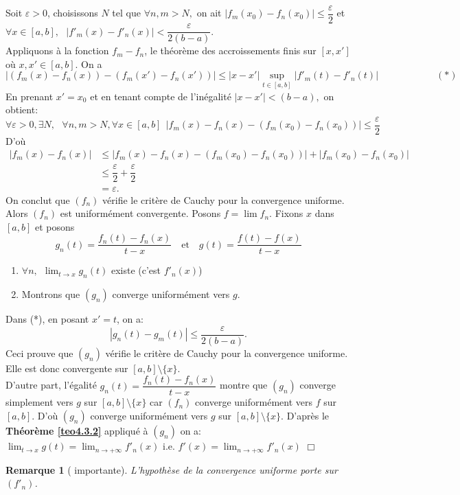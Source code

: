 \documentclass[11pt, a4paper]{book}
\newtheorem{rem}{Remarque}[section]
\newenvironment{pr}{\noindent {\bf Preuve} \noindent} {\hfill $\Box$\vskip 5mm}
\begin{document}
\begin{pr}\quad

Soit $\varepsilon>0$, choisissons $N$ tel que $\forall n,m>N,$ on ait $|f_m(x_0)-f_n(x_0)|\leq\dfrac{\varepsilon}{2}$ et $\forall x\in [a,b],~~~|f'_m(x)-f'_n(x)|<\dfrac{\varepsilon}{2(b-a)}.$\\
Appliquons \`a la fonction $f_m-f_n$, le th\'eor\`eme des accroissements finis sur $[x,x']$ o\`u $x,x'\in [a,b].$ On a $$|(f_m(x)-f_n(x))-(f_m(x')-f_n(x'))|\leq|x-x'|\sup_{t\in [a,b]}|f'_m(t)-f'_n(t)| \qquad\qquad\qquad(*)$$
En prenant $x'=x_0$ et en tenant compte de l'in\'egalit\'e $|x-x'|<(b-a),$ on obtient:
$$\forall \varepsilon>0,\exists N,~~~\forall n,m>N,\forall x\in[a,b]~~|f_m(x)-f_n(x)-(f_m(x_0)-f_n(x_0))|\leq\dfrac{\varepsilon}{2}$$ D'o\`u 
\begin{align*}
|f_m(x)-f_n(x)|&\leq|f_m(x)-f_n(x)-\left(f_m(x_0)-f_n(x_0)\right)|+|f_m(x_0)-f_n(x_0)|\\&\leq \dfrac{\varepsilon}{2}+\dfrac{\varepsilon}{2}\\&=\varepsilon.
\end{align*}
On conclut que $(f_n)$ v\'erifie le crit\`ere de Cauchy pour la convergence uniforme. Alors $(f_n)$ est uniform\'ement convergente. Posons $f=\lim f_n$. Fixons $x$ dans $[a,b]$ et posons $$ g_n(t)=\dfrac{f_n(t)-f_n(x)}{t-x}\quad\text{et}  \quad g(t)=\dfrac{f(t)-f(x)}{t-x}$$
\begin{enumerate}
\item ${\displaystyle \forall n,~~\lim_{t\rightarrow x}g_n(t)}$ existe (c'est $f'_n(x)$)
\item Montrons que $(g_n)$ converge uniform\'ement vers $g$. 
\end{enumerate}
Dans (*), en posant $x'=t$, on a:$$|g_n(t)-g_m(t)|\leq\dfrac{\varepsilon}{2(b-a)}.$$ Ceci prouve que $(g_n)$ v\'erifie le crit\`ere de Cauchy pour la convergence uniforme. Elle est donc convergente sur $[a,b]\setminus\{x\}.$ \\
D'autre part, l'\'egalit\'e $g_n(t)=\dfrac{f_n(t)-f_n(x)}{t-x}$ montre que $(g_n)$ converge simplement vers $g$ sur $[a,b]\setminus\{x\}$ car $(f_n)$ converge uniform\'ement vers $f$ sur $[a,b]$. D'o\`u $(g_n)$ converge uniform\'ement vers $g$ sur $[a,b]\setminus\{x\}$. D'apr\`es le \textbf{Th\'eor\`eme \ref{teo4.3.2}} appliqu\'e \`a $(g_n)$ on a: ${\displaystyle \lim_{t\rightarrow x}g(t)=\lim_{n\rightarrow+\infty}f'_n(x)}$ i.e. ${\displaystyle f'(x)=\lim_{n\rightarrow+\infty}f'_n(x)}$ \end{pr}
\begin{rem}[ importante] L'hypoth\`ese de la convergence uniforme porte sur $(f'_n)$.
\end{rem}
\end{document}
